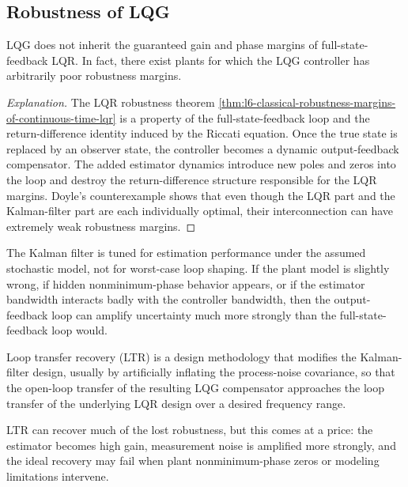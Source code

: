\subsection{Robustness of LQG}
\label{sec:l8-robustness-of-lqg}

\begin{theorem}\label{thm:l8-doyle-s-counterexample}
	LQG does not inherit the guaranteed gain and phase margins of full-state-feedback LQR. In fact, there exist plants for which the LQG controller has arbitrarily poor robustness margins.
\end{theorem}
\begin{proof}[Explanation]
	The LQR robustness theorem \autoref{thm:l6-classical-robustness-margins-of-continuous-time-lqr} is a property of the full-state-feedback loop and the return-difference identity induced by the Riccati equation. Once the true state is replaced by an observer state, the controller becomes a dynamic output-feedback compensator. The added estimator dynamics introduce new poles and zeros into the loop and destroy the return-difference structure responsible for the LQR margins. Doyle's counterexample shows that even though the LQR part and the Kalman-filter part are each individually optimal, their interconnection can have extremely weak robustness margins.
\end{proof}

\begin{remark}
	The Kalman filter is tuned for estimation performance under the assumed stochastic model, not for worst-case loop shaping. If the plant model is slightly wrong, if hidden nonminimum-phase behavior appears, or if the estimator bandwidth interacts badly with the controller bandwidth, then the output-feedback loop can amplify uncertainty much more strongly than the full-state-feedback loop would.
\end{remark}

\begin{definition}\label{def:l8-loop-transfer-recovery}
	Loop transfer recovery (LTR) is a design methodology that modifies the Kalman-filter design, usually by artificially inflating the process-noise covariance, so that the open-loop transfer of the resulting LQG compensator approaches the loop transfer of the underlying LQR design over a desired frequency range.
\end{definition}

\begin{remark}
	LTR can recover much of the lost robustness, but this comes at a price: the estimator becomes high gain, measurement noise is amplified more strongly, and the ideal recovery may fail when plant nonminimum-phase zeros or modeling limitations intervene.
\end{remark}

